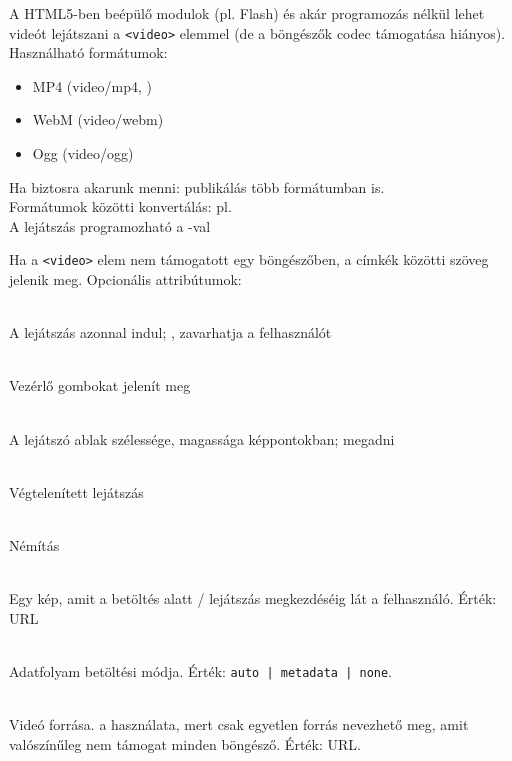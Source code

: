 \begin{frame}
  A HTML5-ben beépülő modulok (pl. Flash) és akár programozás nélkül 
  lehet videót lejátszani a \texttt{<video>} elemmel (de a böngészők codec 
  támogatása hiányos). Használható formátumok:
  \begin{itemize}
    \item MP4 (video/mp4, )
    \item WebM (video/webm)
    \item Ogg (video/ogg)
  \end{itemize}
  Ha biztosra akarunk menni: publikálás több formátumban is.\\
  Formátumok közötti konvertálás: pl. 
  \\
  A lejátszás programozható a -val\\
\end{frame}

\begin{frame}
  Ha a \texttt{<video>} elem nem támogatott egy böngészőben, a 
  címkék közötti szöveg jelenik meg. Opcionális attribútumok:
  \begin{description}[m]
    \item[\texttt{<autoplay>}] \hfill \\ A lejátszás azonnal indul; 
    , zavarhatja a felhasználót
    \item[\texttt{<controls>}] \hfill \\ Vezérlő gombokat jelenít meg
    \item[\texttt{<width>}, \texttt{<height>}] \hfill \\ A lejátszó 
    ablak szélessége, magassága képpontokban;  megadni
    \item[\texttt{<loop>}] \hfill \\ Végtelenített lejátszás
  \end{description}
\end{frame}

\begin{frame}
  \begin{description}[m]
    \item[\texttt{<muted>}] \hfill \\ Némítás
    \item[\texttt{<poster>}] \hfill \\ Egy kép, amit a betöltés 
    alatt / lejátszás megkezdéséig lát a felhasználó. Érték: URL
    \item[\texttt{<preload>}] \hfill \\ Adatfolyam betöltési módja. 
    Érték: \texttt{auto | metadata | none}.
    \item[\texttt{<src>}] \hfill \\ Videó forrása.  a használata, mert csak egyetlen forrás nevezhető meg, 
    amit valószínűleg nem támogat minden böngésző. Érték: URL.
  \end{description}
\end{frame}

